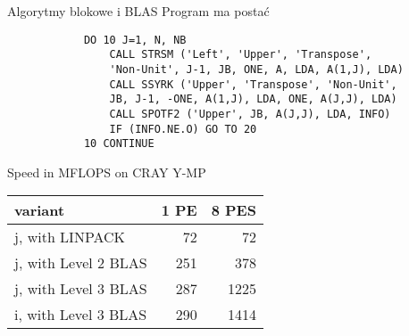 	\begin{frame}[fragile]{Algorytmy blokowe i BLAS}
	Program ma postać
		\begin{lstlisting}
			DO 10 J=1, N, NB
				CALL STRSM ('Left', 'Upper', 'Transpose', 
				'Non-Unit', J-1, JB, ONE, A, LDA, A(1,J), LDA)
				CALL SSYRK ('Upper', 'Transpose', 'Non-Unit', 
				JB, J-1, -ONE, A(1,J), LDA, ONE, A(J,J), LDA)
				CALL SPOTF2 ('Upper', JB, A(J,J), LDA, INFO)
				IF (INFO.NE.O) GO TO 20
			10 CONTINUE
		\end{lstlisting}
	\end{frame}
	\begin{frame}{Speed in MFLOPS on CRAY Y-MP}
		\begin{center}
    			\begin{tabular}{| l | r | r |}
   				 \hline
				 variant & 1 PE & 8 PES \\
				 \hline
				 j, with LINPACK & 72 & 72 \\
				 j, with Level 2 BLAS & 251 & 378 \\
				 j, with Level 3 BLAS & 287 & 1225 \\
				 i, with Level 3 BLAS & 290 & 1414 \\
				 \hline
			\end{tabular}
		\end{center}
	\end{frame}
	

	